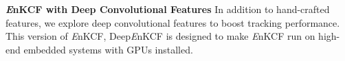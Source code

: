 \documentclass[10pt,twocolumn,letterpaper]{article}
\begin{document}
\textbf{{\it E}nKCF with Deep Convolutional Features} In addition to
hand-crafted features, we explore deep convolutional features to boost tracking
performance. This version of {\it E}nKCF, Deep{\it E}nKCF is designed
to make {\it E}nKCF run on high-end embedded systems with GPUs
installed.

\end{document}
